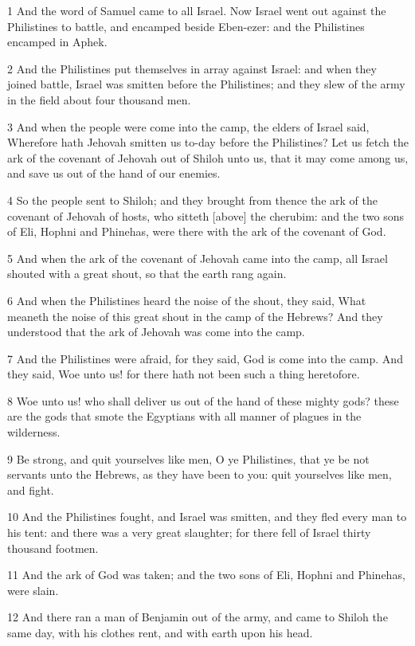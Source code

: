 \par 1 And the word of Samuel came to all Israel. Now Israel went out against the Philistines to battle, and encamped beside Eben-ezer: and the Philistines encamped in Aphek.
\par 2 And the Philistines put themselves in array against Israel: and when they joined battle, Israel was smitten before the Philistines; and they slew of the army in the field about four thousand men.
\par 3 And when the people were come into the camp, the elders of Israel said, Wherefore hath Jehovah smitten us to-day before the Philistines? Let us fetch the ark of the covenant of Jehovah out of Shiloh unto us, that it may come among us, and save us out of the hand of our enemies.
\par 4 So the people sent to Shiloh; and they brought from thence the ark of the covenant of Jehovah of hosts, who sitteth [above] the cherubim: and the two sons of Eli, Hophni and Phinehas, were there with the ark of the covenant of God.
\par 5 And when the ark of the covenant of Jehovah came into the camp, all Israel shouted with a great shout, so that the earth rang again.
\par 6 And when the Philistines heard the noise of the shout, they said, What meaneth the noise of this great shout in the camp of the Hebrews? And they understood that the ark of Jehovah was come into the camp.
\par 7 And the Philistines were afraid, for they said, God is come into the camp. And they said, Woe unto us! for there hath not been such a thing heretofore.
\par 8 Woe unto us! who shall deliver us out of the hand of these mighty gods? these are the gods that smote the Egyptians with all manner of plagues in the wilderness.
\par 9 Be strong, and quit yourselves like men, O ye Philistines, that ye be not servants unto the Hebrews, as they have been to you: quit yourselves like men, and fight.
\par 10 And the Philistines fought, and Israel was smitten, and they fled every man to his tent: and there was a very great slaughter; for there fell of Israel thirty thousand footmen.
\par 11 And the ark of God was taken; and the two sons of Eli, Hophni and Phinehas, were slain.
\par 12 And there ran a man of Benjamin out of the army, and came to Shiloh the same day, with his clothes rent, and with earth upon his head.
